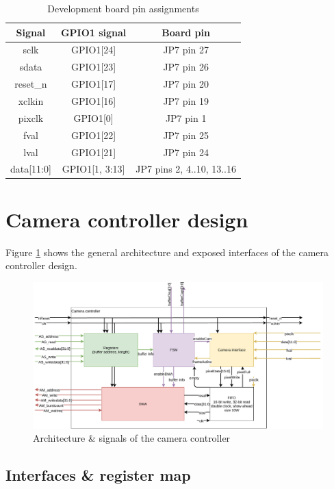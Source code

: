 \documentclass[12pt,a4paper]{article}
\begin{document}
\begin{table}[ht]
	\centering
	\begin{tabular}{|c|c|c|}
		\hline
		Signal & GPIO1 signal & Board pin \\
		\hline
		\hline
		sclk & GPIO1[24] & JP7 pin 27 \\
		\hline
		sdata & GPIO1[23] & JP7 pin 26 \\
		\hline
		reset\_n & GPIO1[17] & JP7 pin 20 \\
		\hline
		xclkin & GPIO1[16] & JP7 pin 19 \\
		\hline
		pixclk & GPIO1[0] & JP7 pin 1 \\
		\hline
		fval & GPIO1[22] & JP7 pin 25 \\
		\hline
		lval & GPIO1[21] & JP7 pin 24 \\
		\hline
		data[11:0] & GPIO1[1, 3:13] & JP7 pins 2, 4..10, 13..16 \\
		\hline
	\end{tabular}
	\caption{Development board pin assignments}
	\label{tab:gpio}
\end{table}


\section{Camera controller design}

Figure \ref{fig:architecture} shows the general architecture and exposed interfaces of the camera controller design. 

\begin{figure}[h!]
	\centering
	\includegraphics[width=\textwidth]{figures/architecture}
	\caption{Architecture \& signals of the camera controller}
	\label{fig:architecture}
\end{figure}


\subsection{Interfaces \& register map}
\end{document}
